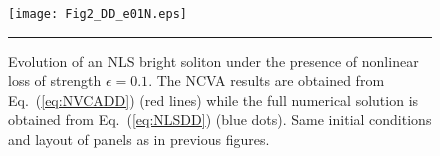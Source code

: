 { \begin{figure}[htbp]
  \centering
  \centerline{\texttt{[image: Fig2\_DD\_e01N.eps]}}
  \rule{35em}{0.5pt}
  \caption[NLS with Density Dependent Loss, $\epsilon = 0.1$]{Evolution of an NLS bright soliton under the presence of nonlinear loss of strength $\epsilon=0.1$.  The NCVA results are obtained from Eq.~(\ref{eq:NVCADD}) (red lines) while the full numerical solution is obtained from Eq.~(\ref{eq:NLSDD}) (blue dots).  Same initial conditions and layout of panels as in previous figures.}
   \label{fig:DDloss01}
\end{figure}
 
%
%
%
%

}
